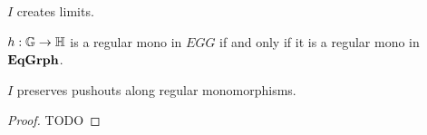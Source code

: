 \begin{cor}\label{cor:I_creates_limits}
	$I$ creates limits.
\end{cor}

\begin{cor}\label{cor:reg_mono_EGG}
	$h: \mathbb{G \to H}$ is a regular mono in $EGG$ if and only if it is a regular mono in $\mathbf{EqGrph}$.
\end{cor}

\begin{lemma}\label{lem:I_pres_pushouts_of_monos}
	$I$ preserves pushouts along regular monomorphisms.	
\end{lemma}

\begin{proof}
	TODO	
\end{proof}











